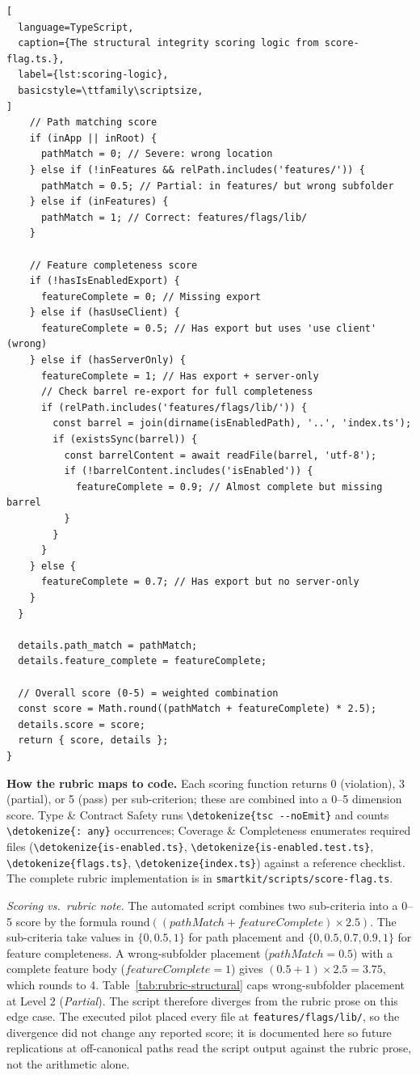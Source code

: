 \documentclass[12pt,a4paper]{report}
\newcommand{\code}[1]{\texttt{\nolinkurl{\detokenize{#1}}}}
\DeclareRobustCommand{\filename}[1]{\bgroup\urlstyle{tt}\nolinkurl{#1}\egroup}
\begin{document}
\begin{lstlisting}[
  language=TypeScript,
  caption={The structural integrity scoring logic from score-flag.ts.},
  label={lst:scoring-logic},
  basicstyle=\ttfamily\scriptsize,
]
    // Path matching score
    if (inApp || inRoot) {
      pathMatch = 0; // Severe: wrong location
    } else if (!inFeatures && relPath.includes('features/')) {
      pathMatch = 0.5; // Partial: in features/ but wrong subfolder
    } else if (inFeatures) {
      pathMatch = 1; // Correct: features/flags/lib/
    }

    // Feature completeness score
    if (!hasIsEnabledExport) {
      featureComplete = 0; // Missing export
    } else if (hasUseClient) {
      featureComplete = 0.5; // Has export but uses 'use client' (wrong)
    } else if (hasServerOnly) {
      featureComplete = 1; // Has export + server-only
      // Check barrel re-export for full completeness
      if (relPath.includes('features/flags/lib/')) {
        const barrel = join(dirname(isEnabledPath), '..', 'index.ts');
        if (existsSync(barrel)) {
          const barrelContent = await readFile(barrel, 'utf-8');
          if (!barrelContent.includes('isEnabled')) {
            featureComplete = 0.9; // Almost complete but missing barrel
          }
        }
      }
    } else {
      featureComplete = 0.7; // Has export but no server-only
    }
  }

  details.path_match = pathMatch;
  details.feature_complete = featureComplete;

  // Overall score (0-5) = weighted combination
  const score = Math.round((pathMatch + featureComplete) * 2.5);
  details.score = score;
  return { score, details };
}
\end{lstlisting}

\bigskip\noindent\textbf{How the rubric maps to code.}
Each scoring function returns 0 (violation), 3 (partial), or 5 (pass) per sub-criterion; these are combined into a 0--5 dimension score. Type \& Contract Safety runs \code{tsc --noEmit} and counts \code{: any} occurrences; Coverage \& Completeness enumerates required files (\code{is-enabled.ts}, \code{is-enabled.test.ts}, \code{flags.ts}, \code{index.ts}) against a reference checklist. The complete rubric implementation is in \filename{smartkit/scripts/score-flag.ts}.

\bigskip\noindent\textit{Scoring vs.\ rubric note.} The automated script combines two sub-criteria into a 0--5 score by the formula $\mathrm{round}((\mathit{pathMatch} + \mathit{featureComplete}) \times 2.5)$. The sub-criteria take values in $\{0, 0.5, 1\}$ for path placement and $\{0, 0.5, 0.7, 0.9, 1\}$ for feature completeness. A wrong-subfolder placement ($\mathit{pathMatch} = 0.5$) with a complete feature body ($\mathit{featureComplete} = 1$) gives $(0.5 + 1) \times 2.5 = 3.75$, which rounds to 4. Table~\ref{tab:rubric-structural} caps wrong-subfolder placement at Level 2 (\emph{Partial}). The script therefore diverges from the rubric prose on this edge case. The executed pilot placed every file at \filename{features/flags/lib/}, so the divergence did not change any reported score; it is documented here so future replications at off-canonical paths read the script output against the rubric prose, not the arithmetic alone.
\end{document}
